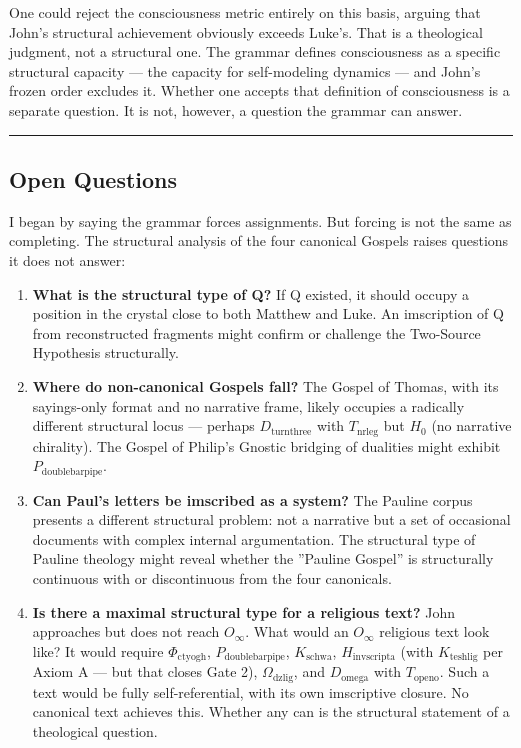 \documentclass[12pt,a4paper]{article}
\begin{document}
One could reject the consciousness metric entirely on this basis, arguing that John's structural achievement obviously exceeds Luke's. That is a theological judgment, not a structural one. The grammar defines consciousness as a specific structural capacity --- the capacity for self-modeling dynamics --- and John's frozen order excludes it. Whether one accepts that definition of consciousness is a separate question. It is not, however, a question the grammar can answer.

\begin{center}
\rule{0.5\textwidth}{0.4pt}
\end{center}

\subsection{Open Questions}

I began by saying the grammar forces assignments. But forcing is not the same as completing. The structural analysis of the four canonical Gospels raises questions it does not answer:

\begin{enumerate}
    \item \textbf{What is the structural type of Q?} If Q existed, it should occupy a position in the crystal close to both Matthew and Luke. An imscription of Q from reconstructed fragments might confirm or challenge the Two-Source Hypothesis structurally.
    \item \textbf{Where do non-canonical Gospels fall?} The Gospel of Thomas, with its sayings-only format and no narrative frame, likely occupies a radically different structural locus --- perhaps $D_{\text{turnthree}}$ with $T_{\text{nrleg}}$ but $H_0$ (no narrative chirality). The Gospel of Philip's Gnostic bridging of dualities might exhibit $P_{\text{doublebarpipe}}$.
    \item \textbf{Can Paul's letters be imscribed as a system?} The Pauline corpus presents a different structural problem: not a narrative but a set of occasional documents with complex internal argumentation. The structural type of Pauline theology might reveal whether the ''Pauline Gospel'' is structurally continuous with or discontinuous from the four canonicals.
    \item \textbf{Is there a maximal structural type for a religious text?} John approaches but does not reach $O_{\infty}$. What would an $O_{\infty}$ religious text look like? It would require $\Phi_{\text{ctyogh}}$, $P_{\text{doublebarpipe}}$, $K_{\text{schwa}}$, $H_{\text{invscripta}}$ (with $K_{\text{teshlig}}$ per Axiom A --- but that closes Gate 2), $\Omega_{\text{dzlig}}$, and $D_{\text{omega}}$ with $T_{\text{openo}}$. Such a text would be fully self-referential, with its own imscriptive closure. No canonical text achieves this. Whether any can is the structural statement of a theological question.
\end{enumerate}
\end{document}
